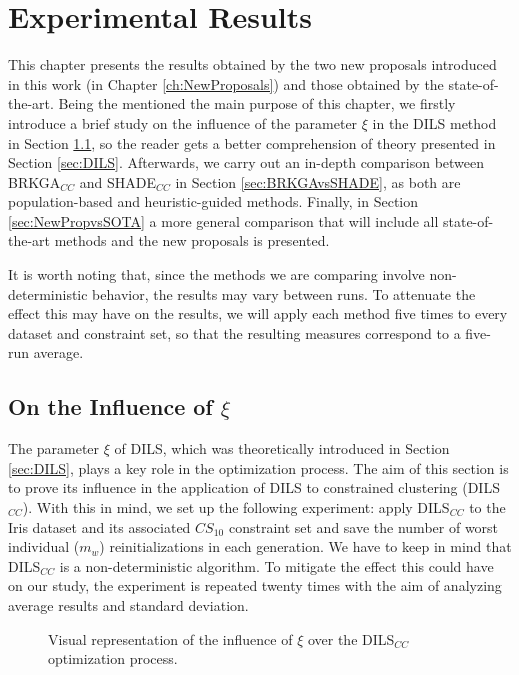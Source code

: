 \chapter{Experimental Results} \label{ch:ExperimentalResults}

This chapter presents the results obtained by the two new proposals introduced in this work (in Chapter \ref{ch:NewProposals}) and those obtained by the state-of-the-art. Being the mentioned the main purpose of this chapter, we firstly introduce a brief study on the influence of the parameter $\xi$ in the \acs{DILS} method in Section \ref{sec:XiInfl}, so the reader gets a better comprehension of theory presented in Section \ref{sec:DILS}. Afterwards, we carry out an in-depth comparison between \acs{BRKGA}$_{CC}$ and \acs{SHADE}$_{CC}$ in Section \ref{sec:BRKGAvsSHADE}, as both are population-based and heuristic-guided methods. Finally, in Section \ref{sec:NewPropvsSOTA} a more general comparison that will include all state-of-the-art methods and the new proposals is presented.

It is worth noting that, since the methods we are comparing involve non-deterministic behavior, the results may vary between runs. To attenuate the effect this may have on the results, we will apply each method five times to every dataset and constraint set, so that the resulting measures correspond to a five-run average.

\section{On the Influence of $\xi$} \label{sec:XiInfl}

The parameter $\xi$ of \acs{DILS}, which was theoretically introduced in Section \ref{sec:DILS}, plays a key role in the optimization process. The aim of this section is to prove its influence in the application of \acs{DILS} to constrained clustering (\acs{DILS}$_{CC}$). With this in mind, we set up the following experiment: apply \acs{DILS}$_{CC}$ to the Iris dataset and its associated $CS_{10}$ constraint set and save the number of worst individual ($m_w$) reinitializations in each generation. We have to keep in mind that \acs{DILS}$_{CC}$ is a non-deterministic algorithm. To mitigate the effect this could have on our study, the experiment is repeated twenty times with the aim of analyzing average results and standard deviation.

\begin{figure}[bth]
	\myfloatalign
	\hspace{1cm}
	\caption{Visual representation of the influence of $\xi$ over the \acs{DILS}$_{CC}$ optimization process.}
	\label{fig:RestartsLines}
\end{figure}

